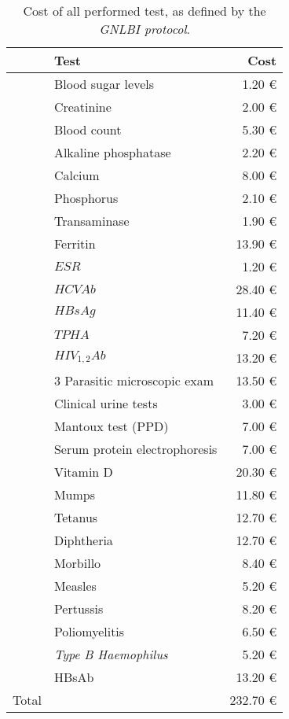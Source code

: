 \begin{table}[H]
   \centering
   \begin{tabular}{c l r}
       & Test & Cost\footnotemark[6]\\
      \hline
       & Blood sugar levels & 1.20 €\\
	  & Creatinine & 2.00 €\\
	  & Blood count & 5.30 €\\
	  & Alkaline phosphatase & 2.20 €\\
	  & Calcium & 8.00 €\\
	  & Phosphorus & 2.10 €\\
	  & Transaminase & 1.90 €\\
	  & Ferritin & 13.90 €\\
	  & $ESR$ & 1.20 €\\
 	  & $HCVAb$ & 28.40 €\\
   	  & $HBsAg$ & 11.40 €\\
	  & $TPHA$ & 7.20 €\\
	  & $HIV_{1,2}Ab$ & 13.20 €\\
	  & 3 Parasitic microscopic exam & 13.50 €\\
	  & Clinical urine tests & 3.00 €\\
	  & Mantoux test (PPD) & 7.00 €\\
	  & Serum protein electrophoresis & 7.00 €\\
	  & Vitamin D & 20.30 €\\
	  \cline{2-3}
	 \parbox[t]{2mm}{} & Mumps & 11.80 €\\
	  & Tetanus & 12.70 €\\
	  & Diphtheria & 12.70 €\\
	  & Morbillo & 8.40 €\\
	  & Measles & 5.20 €\\
	  & Pertussis & 8.20 €\\
	  & Poliomyelitis & 6.50 €\\
	  & \textit{Type B Haemophilus} & 5.20 €\\
	  & HBsAb & 13.20 €\\
	 \hline
	 Total & & 232.70 €\\
   \end{tabular}
   \caption{Cost of all performed test, as defined by the \textit{GNLBI protocol}.}
    \label{tab:costs}
\end{table}

